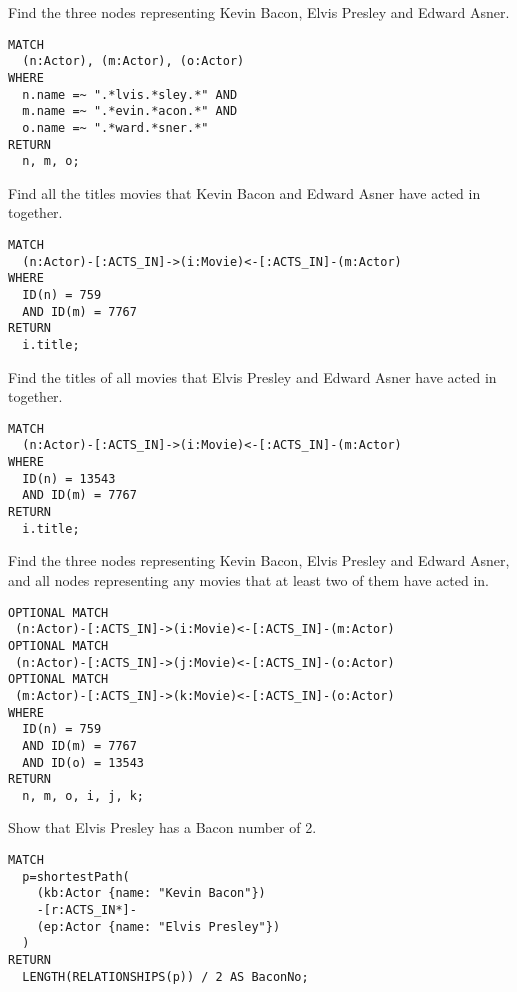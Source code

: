 \documentclass[a4paper,12pt]{exam}
\begin{document}
\begin{questions}
\question
Find the three nodes representing Kevin Bacon, Elvis Presley and Edward Asner.
\begin{solution}
\begin{verbatim}
MATCH
  (n:Actor), (m:Actor), (o:Actor)
WHERE
  n.name =~ ".*lvis.*sley.*" AND 
  m.name =~ ".*evin.*acon.*" AND 		
  o.name =~ ".*ward.*sner.*"
RETURN
  n, m, o;
\end{verbatim}
\end{solution}

\question
Find all the titles movies that Kevin Bacon and Edward Asner have acted in together.
\begin{solution}
  \begin{verbatim}
MATCH
  (n:Actor)-[:ACTS_IN]->(i:Movie)<-[:ACTS_IN]-(m:Actor)
WHERE
  ID(n) = 759
  AND ID(m) = 7767
RETURN
  i.title;
  \end{verbatim}
\end{solution}

\question
Find the titles of all movies that Elvis Presley and Edward Asner have acted in together.
\begin{solution}
  \begin{verbatim}
MATCH
  (n:Actor)-[:ACTS_IN]->(i:Movie)<-[:ACTS_IN]-(m:Actor)
WHERE
  ID(n) = 13543
  AND ID(m) = 7767
RETURN
  i.title;
  \end{verbatim}
\end{solution}

\question
Find the three nodes representing Kevin Bacon, Elvis Presley and Edward Asner, and all nodes representing any movies that at least two of them have acted in.
\begin{solution}
  \begin{verbatim}
OPTIONAL MATCH
 (n:Actor)-[:ACTS_IN]->(i:Movie)<-[:ACTS_IN]-(m:Actor)
OPTIONAL MATCH
 (n:Actor)-[:ACTS_IN]->(j:Movie)<-[:ACTS_IN]-(o:Actor)
OPTIONAL MATCH
 (m:Actor)-[:ACTS_IN]->(k:Movie)<-[:ACTS_IN]-(o:Actor)
WHERE
  ID(n) = 759
  AND ID(m) = 7767
  AND ID(o) = 13543
RETURN
  n, m, o, i, j, k;
  \end{verbatim}
\end{solution}

\question
Show that Elvis Presley has a Bacon number of 2.
\begin{solution}
  \begin{verbatim}
MATCH
  p=shortestPath(
    (kb:Actor {name: "Kevin Bacon"})
    -[r:ACTS_IN*]-
    (ep:Actor {name: "Elvis Presley"})
  )
RETURN
  LENGTH(RELATIONSHIPS(p)) / 2 AS BaconNo;
  \end{verbatim}
\end{solution}


\end{questions}
\end{document}
